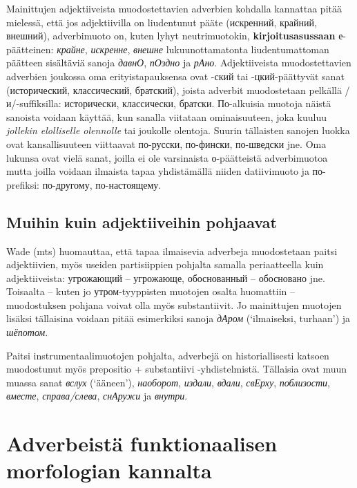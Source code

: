 \documentclass[]{scrreprt}
\begin{document}
Mainittujen adjektiiveista muodostettavien adverbien kohdalla kannattaa
pitää mielessä, että jos adjektiivilla on liudentunut pääte (искренний,
крайний, внешний), adverbimuoto on, kuten lyhyt neutrimuotokin,
\textbf{kirjoitusasussaan} е-päätteinen: \emph{крайне}, \emph{искренне},
\emph{внешне} lukuunottamatonta liudentumattoman päätteen sisältäviä
sanoja \emph{давнО}, \emph{пОздно} ja \emph{рАно}. Adjektiiveista
muodostettavien adverbien joukossa oma erityistapauksensa ovat -ский tai
-цкий-päättyvät sanat (исторический, классический, братский), joista
adverbit muodostetaan pelkällä /и/-suffiksilla: исторически,
классически, братски. По-alkuisia muotoja näistä sanoista voidaan
käyttää, kun sanalla viitataan ominaisuuteen, joka kuuluu \emph{jollekin
elolliselle olennolle} tai joukolle olentoja. Suurin tällaisten sanojen
luokka ovat kansallisuuteen viittaavat по-русски, по-фински, по-шведски
jne. Oma lukunsa ovat vielä sanat, joilla ei ole varsinaista
о-päätteistä adverbimuotoa mutta joilla voidaan ilmaista tapaa
yhdistämällä niiden datiivimuoto ja по-prefiksi: по-другому,
по-настоящему.

\subsection{Muihin kuin adjektiiveihin
pohjaavat}\label{muihin-kuin-adjektiiveihin-pohjaavat}

Wade (mts) huomauttaa, että tapaa ilmaisevia adverbeja muodostetaan
paitsi adjektiivien, myös useiden partisiippien pohjalta samalla
periaatteella kuin adjektiiveista: угрожающий -- угрожающе, обоснованный
-- обосновано jne. Toisaalta -- kuten jo утром-tyyppisten muotojen
osalta huomattiin -- muodostuksen pohjana voivat olla myös
substantiivit. Jo mainittujen muotojen lisäksi tällaisina voidaan pitää
esimerkiksi sanoja \emph{дАром} (`ilmaiseksi, turhaan') ja
\emph{шёпотом}.

Paitsi instrumentaalimuotojen pohjalta, adverbejä on historiallisesti
katsoen muodostunut myös prepositio + substantiivi -yhdistelmistä.
Tällaisia ovat muun muassa sanat \emph{вслух} (`ääneen'),
\emph{наоборот}, \emph{издали}, \emph{вдали}, \emph{свЕрху},
\emph{поблизости}, \emph{вместе}, \emph{справа/слева}, \emph{снАружи} ja
\emph{внутри}.

\section{Adverbeistä funktionaalisen morfologian
kannalta}\label{adverbeistuxe4-funktionaalisen-morfologian-kannalta}
\end{document}
